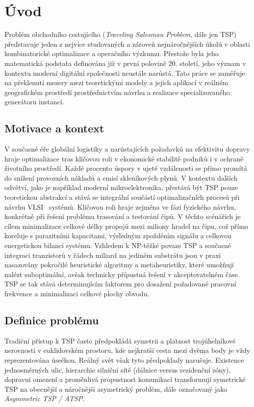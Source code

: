 \chapter{Úvod}
\label{sec:Introduction}
Problém obchodního cestujícího (\textit{Traveling Salesman Problem}, dále jen TSP) představuje jeden z nejvíce studovaných a zároveň nejnáročnějších úkolů v oblasti kombinatorické optimalizace a operačního výzkumu. Přestože byla jeho matematická podstata definována již v první polovině 20. století, jeho význam v kontextu moderní digitální společnosti neustále narůstá. Tato práce se zaměřuje na překlenutí mezery mezi teoretickými modely a jejich aplikací v reálném geografickém prostředí prostřednictvím návrhu a realizace specializovaného generátoru instancí.

\section{Motivace a kontext}
V současné éře globální logistiky a narůstajících požadavků na efektivitu dopravy hraje optimalizace tras klíčovou roli v ekonomické stabilitě podniků i v ochraně životního prostředí. Každé procento úspory v ujeté vzdálenosti se přímo promítá do snížení provozních nákladů a emisí skleníkových plynů. V kontextu dalších odvětví, jako je například moderní mikroelektronika, přestává být TSP pouze teoretickou abstrakcí a stává se integrální součástí optimalizačních procesů při návrhu VLSI~\cite{geeksforgeeks_what_is_vlsi} systémů. Klíčovou roli hraje zejména ve fázi fyzického návrhu, konkrétně při řešení problému trasování a testování čipů. V těchto scénářích je cílem minimalizace celkové délky propojů mezi miliony hradel na čipu, což přímo koreluje s parazitními kapacitami, výsledným zpožděním signálu a celkovou energetickou bilancí systému. Vzhledem k NP-těžké povaze TSP a současné integraci tranzistorů v řádech miliard na jediném substrátu jsou v praxi nasazovány pokročilé heuristické algoritmy a metaheuristiky, které umožňují nalézt suboptimální, avšak technicky přípustná řešení v akceptovatelném čase. TSP se tak stává determinujícím faktorem pro dosažení požadované pracovní frekvence a minimalizaci celkové plochy obvodu.

\section{Definice problému}
Tradiční přístup k TSP často předpokládá symetrii a platnost trojúhelníkové nerovnosti v euklidovském prostoru, kde nejkratší cesta mezi dvěma body je vždy reprezentována úsečkou. Reálný svět však tyto předpoklady narušuje. Existence jednosměrných ulic, hierarchie silniční sítě (dálnice versus rezidenční zóny), dopravní omezení a proměnlivá propustnost komunikací transformují symetrické TSP na obecnější a náročnější asymetrický problém, dále označovaný jako \textit{Asymmetric TSP / ATSP}.

